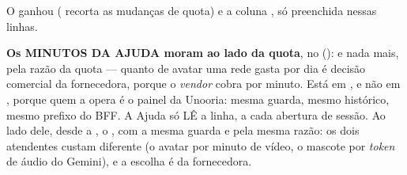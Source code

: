 O  ganhou  ( recorta as
mudanças de quota) e a coluna , só preenchida nessas linhas.

\textbf{Os MINUTOS DA AJUDA moram ao lado da quota}, no
 ():  e nada
mais, pela razão da quota --- quanto de avatar uma rede gasta por dia é decisão
comercial da fornecedora, porque o \emph{vendor} cobra por minuto. Está em
, e não em , porque quem a opera é o painel da
Unooria: mesma guarda, mesmo histórico, mesmo prefixo do BFF. A Ajuda só LÊ a
linha, a cada abertura de sessão. Ao lado dele, desde a , o
, com a mesma guarda e pela mesma razão: os
dois atendentes custam diferente (o avatar por minuto de vídeo, o mascote por
\emph{token} de áudio do Gemini), e a escolha é da fornecedora.

